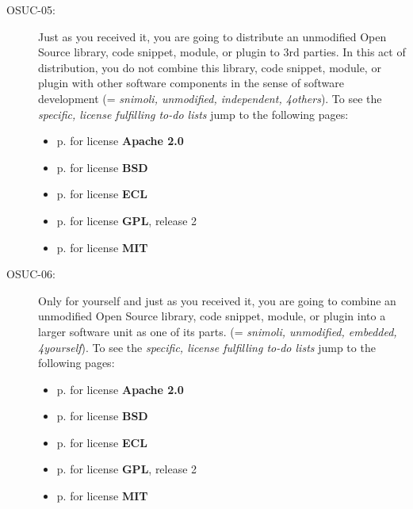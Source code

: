 \begin{description}
\item[OSUC-05:]\label{OSUC-05-DEF} Just as you received it, you are going to
distribute an unmodified Open Source library, code snippet, module, or plugin to
3rd parties. In this act of distribution, you do not combine this library, code
snippet, module, or plugin with other software components in the sense of
software development (= \textit{snimoli, unmodified, independent, 4others}).
To see the \textit{specific, license fulfilling to-do lists} jump to the
following pages:
  \begin{itemize}
    \item p. \pageref{OSUC-05-Apache20} for license \textbf{Apache 2.0}
    \item p. \pageref{OSUC-05-BSD} for license \textbf{BSD}
    \item p. \pageref{OSUC-05-ECL} for license \textbf{ECL}
    \item p. \pageref{OSUC-05-GPL2X} for license \textbf{GPL}, release 2
    \item p. \pageref{OSUC-05-MIT} for license \textbf{MIT}
  \end{itemize}

\item[OSUC-06:]\label{OSUC-06-DEF} Only for yourself and just as you received
it, you are going to combine an unmodified Open Source library, code snippet,
module, or plugin into a larger software unit as one of its parts. (=
\textit{snimoli, unmodified, embedded, 4yourself}).
To see the \textit{specific, license fulfilling to-do lists} jump to the
following pages:
  \begin{itemize}
    \item p. \pageref{OSUC-06-Apache20} for license \textbf{Apache 2.0}
    \item p. \pageref{OSUC-06-BSD} for license \textbf{BSD}
    \item p. \pageref{OSUC-06-ECL} for license \textbf{ECL}
    \item p. \pageref{OSUC-06-GPL2X} for license \textbf{GPL}, release 2
    \item p. \pageref{OSUC-06-MIT} for license \textbf{MIT}
  \end{itemize}


\end{description}
